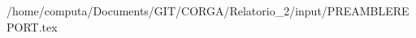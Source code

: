 /home/computa/Documents/GIT/CORGA/Relatorio_2/input/PREAMBLEREPORT.tex
\usepackage{tikz}
\usepackage{circuitikz}
\usetikzlibrary{matrix,shapes.geometric,arrows,trees,positioning,calc}
\begin{comment}
\tikzstyle{RECTANGLE_2} = [rectangle, draw, text width=5em, text centered, rounded corners, minimum height=4em]
\tikzstyle{RECTANGLE_3} = [rectangle, rounded corners, minimum width=3cm, minimum height=1cm,text centered, draw=black, fill=red!80]
\tikzstyle{RECTANGLE_4} = [rectangle, draw, fill=blue!20, text width=3cm, text centered, minimum height=4em]
\tikzstyle{RECTANGLE_5} = [rectangle, minimum width=3cm, minimum height=1cm, text centered, text width=3cm]
\tikzstyle{RECTANGLE_6} = [rectangle, draw, fill=blue!20, text width=5em, text centered, rounded corners, minimum height=4em]
\tikzstyle{RECTANGLE_7} = [rectangle, draw, fill=blue!20, text width=5em, text centered, rounded corners, minimum height=4em]
\tikzstyle{RECTANGLE_8} = [rectangle, draw, align=left, fill=blue!20]
\tikzstyle{RECTANGLE_1} = [rectangle, rounded corners, minimum width=1cm, minimum height=1cm,text centered, draw=black, fill=green!30]
\tikzstyle{DIAMOND_1} = [diamond, draw, fill=blue!20, text width=4.5em, text badly centered, node distance=4cm, inner sep=0pt]
\tikzstyle{DIAMOND_2} = [diamond, minimum width=3cm, minimum height=1cm, text centered, draw=black, fill=green!30]
\tikzstyle{DIAMOND_3} = [diamond, draw, text width=4.5em, text badly centered, node distance=3cm, inner sep=0pt]
\tikzstyle{DIAMOND_4} = [diamond, draw, fill=blue!20, text width=4.5em, text badly centered, node distance=3cm, inner sep=0pt]
\tikzstyle{DIAMOND_5} = [diamond, draw, fill=blue!20, text width=4.5em, text badly centered, node distance=3cm, inner sep=0pt]
\tikzstyle{DIAMOND_6} = [diamond, draw, fill=blue!20, text width=4.5em, text badly centered, node distance=4cm, inner sep=0pt]
\tikzstyle{DIAMOND_7} = [diamond, draw, align=left, fill=blue!20]
\tikzstyle{ELLIPSE_1} = [draw, ellipse,fill=red!20, node distance=3cm, minimum height=2em]
\tikzstyle{ELLIPSE_2} = [draw, ellipse,fill=red!20, node distance=3cm, minimum height=2em]
\tikzstyle{ELLIPSE} = [draw, ellipse,fill=red!20, node distance=3cm, minimum height=2em]
\tikzstyle{TRAPEZIUM_1} = [trapezium,trapezium left angle=70,trapezium right angle=-70,minimum height=0.6cm, draw, fill=blue!20, text width=4.5em, text badly centered, node distance=3cm, inner sep=0pt]

\end{comment}
